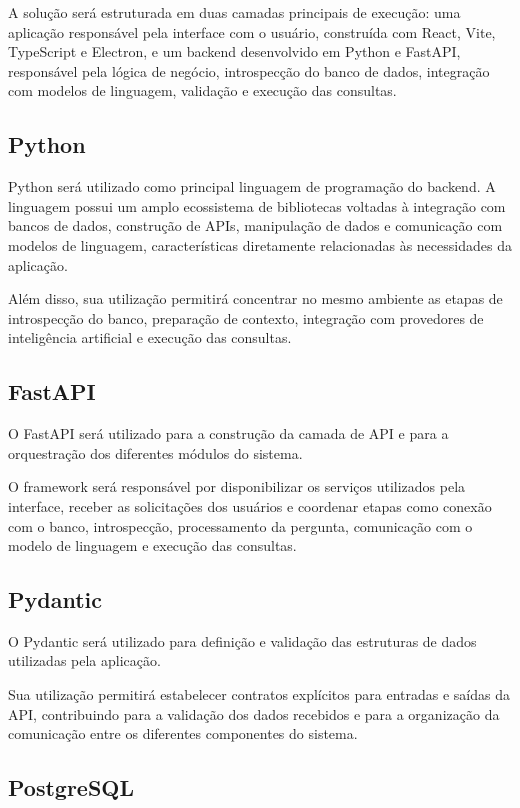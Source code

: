 A solução será estruturada em duas camadas principais de execução: uma aplicação responsável pela interface com o usuário, construída com React, Vite, TypeScript e Electron, e um backend desenvolvido em Python e FastAPI, responsável pela lógica de negócio, introspecção do banco de dados, integração com modelos de linguagem, validação e execução das consultas.


\subsection{Python}

Python será utilizado como principal linguagem de programação do backend. A linguagem possui um amplo ecossistema de bibliotecas voltadas à integração com bancos de dados, construção de APIs, manipulação de dados e comunicação com modelos de linguagem, características diretamente relacionadas às necessidades da aplicação.

Além disso, sua utilização permitirá concentrar no mesmo ambiente as etapas de introspecção do banco, preparação de contexto, integração com provedores de inteligência artificial e execução das consultas.


\subsection{FastAPI}

O FastAPI será utilizado para a construção da camada de API e para a orquestração dos diferentes módulos do sistema.

O framework será responsável por disponibilizar os serviços utilizados pela interface, receber as solicitações dos usuários e coordenar etapas como conexão com o banco, introspecção, processamento da pergunta, comunicação com o modelo de linguagem e execução das consultas.


\subsection{Pydantic}

O Pydantic será utilizado para definição e validação das estruturas de dados utilizadas pela aplicação.

Sua utilização permitirá estabelecer contratos explícitos para entradas e saídas da API, contribuindo para a validação dos dados recebidos e para a organização da comunicação entre os diferentes componentes do sistema.


\subsection{PostgreSQL}

